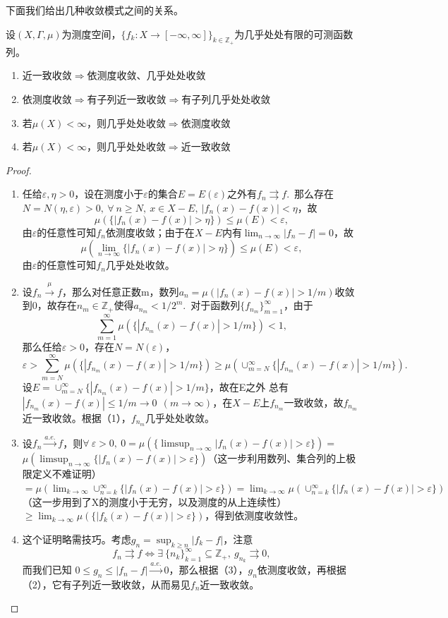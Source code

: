 \documentclass[color=green,thmcnt=section,lang=cn,12pt]{elegantbook}
\numberwithin{equation}{section}%
\numberwithin{figure}{section}%
\newcommand{\ZZ}{\mathbb{Z}}
\newcommand{\ee}{\varepsilon}
\newcommand{\any}{\forall \ }
\newcommand{\exi}{\exists \ }
\newcommand{\cs}[1]{\sum_{#1=1}^{\infty}} %
\newcommand{\kecef}[1]{\{#1_k:X\to [-\infty,\infty]\}_{k\in\ZZ_+}} %
\begin{document}
下面我们给出几种收敛模式之间的关系。
\begin{theorem}\label{shoulianmoshizhijiandeguanxi} %
    设$(X,\Gamma,\mu)$为测度空间，$\kecef{f}$为几乎处处有限的可测函数列。
    \begin{enumerate}[(1)]
        \item 近一致收敛$\Rightarrow$依测度收敛、几乎处处收敛
        \item 依测度收敛$\Rightarrow$有子列近一致收敛$\Rightarrow$有子列几乎处处收敛
        \item 若$\mu(X)<\infty$，则几乎处处收敛$\Rightarrow$依测度收敛
        \item 若$\mu(X)<\infty$，则几乎处处收敛$\Rightarrow$近一致收敛
    \end{enumerate}
\end{theorem}
\begin{proof}
    \begin{enumerate}[(1)]
        \item 任给$\ee,\eta>0$，设在测度小于$\ee$的集合$E=E(\ee)$之外有$f_n\rightrightarrows f$.\ 那么存在$N=N(\eta,\ee)>0,\ \any n\geq N,\ x\in X-E,\ |f_n(x)-f(x)|<\eta$，故
$$\mu(\{|f_n(x)-f(x)|>\eta\})\leq \mu({E})<\ee,$$由$\ee$的任意性可知$f_n$依测度收敛；由于在$X-E$内有$\lim_{n\to \infty}|f_n-f|=0$，故
        $$\mu(\lim_{n\to \infty}\{|f_n(x)-f(x)|>\eta\})\leq \mu({E})<\ee,$$由$\ee$的任意性可知$f_n$几乎处处收敛。
        \item 设$f_n\xrightarrow{\mu}f$，那么对任意正数m，数列$a_n=\mu(|f_n(x)-f(x)|>1/m)$收敛到0，故存在$n_m\in \ZZ_+$使得$a_{n_m}<1/2^m$.\ 
        对于函数列$\{f_{n_m}\}_{m=1}^{\infty}$，由于$$\cs{m}\mu(\{|f_{n_m}(x)-f(x)|>1/m\})<1,$$那么任给$\ee>0$，存在$N=N(\ee)$，
        $$\ee>\sum_{m=N}^{\infty}\mu(\{|f_{n_m}(x)-f(x)|>1/m\})\geq \mu(\cup_{m=N}^{\infty}\{|f_{n_m}(x)-f(x)|>1/m\}).$$设$E=\cup_{m=N}^{\infty}\{|f_{n_m}(x)-f(x)|>1/m\}$，故在E之外
        总有$|f_{n_m}(x)-f(x)|\leq 1/m\to 0\ \ (m\to \infty)$，在$X-E$上$f_{n_m}$一致收敛，故$f_{n_m}$近一致收敛。根据（1），$f_{n_m}$几乎处处收敛。
        \item 设$f_n \xrightarrow{a.e.} f$，则$\any \ee>0,\ 0=\mu(\{\limsup_{n\to \infty}|f_n(x)-f(x)|>\ee\})=$
        $\mu(\limsup_{n\to \infty}\{|f_n(x)-f(x)|>\ee\})$（这一步利用数列、集合列的上极限定义不难证明）
        $=\mu(\lim_{k\to \infty}\cup_{n=k}^{\infty}\{|f_n(x)-f(x)|>\ee\})=\lim_{k\to \infty}\mu(\cup_{n=k}^{\infty}\{|f_n(x)-f(x)|>\ee\})$（这一步用到了X的测度小于无穷，以及测度的从上连续性）
        $\geq \lim_{k\to \infty}\mu(\{|f_k(x)-f(x)|>\ee\})$，得到依测度收敛性。
        \item 这个证明略需技巧。考虑$g_n=\sup_{k\geq n}|f_k-f|$，注意$$f_n\rightrightarrows f \Longleftrightarrow \exi \{n_k\}_{k=1}^{\infty}\subseteq \ZZ_+,\ g_{n_k}\rightrightarrows 0,$$而我们已知
        $0\leq g_n\leq |f_n-f|\xrightarrow{a.e.}0$，那么根据（3），$g_n$依测度收敛，再根据（2），它有子列近一致收敛，从而易见$f_n$近一致收敛。
    \end{enumerate}
\end{proof}
\ 
\end{document}
